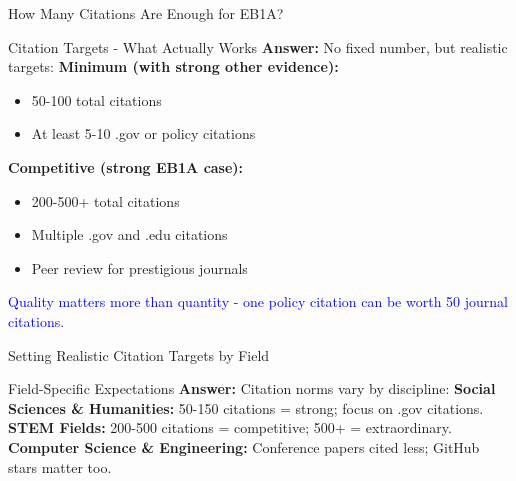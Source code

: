\documentclass[11pt]{beamer}
\begin{document}
	\begin{frame}{How Many Citations Are Enough for EB1A?}
		\small
		\begin{block}{Citation Targets - What Actually Works}
			\textbf{Answer:} No fixed number, but realistic targets:
			\vspace{0.1cm}
			\textbf{Minimum (with strong other evidence):}
			\begin{itemize}
				\item 50-100 total citations
				\item At least 5-10 .gov or policy citations
			\end{itemize}
			\textbf{Competitive (strong EB1A case):}
			\begin{itemize}
				\item 200-500+ total citations
				\item Multiple .gov and .edu citations
				\item Peer review for prestigious journals
			\end{itemize}
			\textcolor{blue}{Quality matters more than quantity - one policy citation can be worth 50 journal citations.}
		\end{block}
	\end{frame}
	
	\begin{frame}{Setting Realistic Citation Targets by Field}
		\small
		\begin{block}{Field-Specific Expectations}
			\textbf{Answer:} Citation norms vary by discipline:
			\vspace{0.1cm}
			\textbf{Social Sciences \& Humanities:} 50-150 citations = strong; focus on .gov citations.
			\vspace{0.1cm}
			\textbf{STEM Fields:} 200-500 citations = competitive; 500+ = extraordinary.
			\vspace{0.1cm}
			\textbf{Computer Science \& Engineering:} Conference papers cited less; GitHub stars matter too.
		\end{block}
	\end{frame}
	
	
\end{document}
